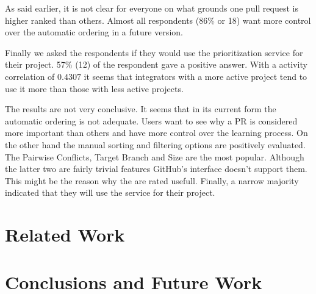\documentclass[conference]{IEEEtran}
\begin{document}
As said earlier, it is not clear for everyone on what grounds one pull request is higher ranked than others.
Almost all respondents (86\% or 18) want more control over the automatic ordering in a future version.

Finally we asked the respondents if they would use the prioritization service for their project.
57\% (12) of the respondent gave a positive answer.
With a activity correlation of $0.4307$ it seems that integrators with a more active project tend to use it more than those with less active projects.

The results are not very conclusive.
It seems that in its current form the automatic ordering is not adequate.
Users want to see why a PR is considered more important than others and have more control over the learning process.
On the other hand the manual sorting and filtering options are positively evaluated.
The Pairwise Conflicts, Target Branch and Size are the most popular.
Although the latter two are fairly trivial features GitHub's interface doesn't support them.
This might be the reason why the are rated usefull.
Finally, a narrow majority indicated that they will use the service for their project.

\section{Related Work}

\section{Conclusions and Future Work}



\end{document}
